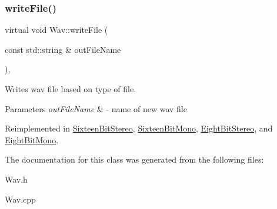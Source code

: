 \subsubsection{\texorpdfstring{write\+File()}{writeFile()}}
{\footnotesize\ttfamily virtual void Wav\+::write\+File (\begin{DoxyParamCaption}\item[{const std\+::string \&}]{out\+File\+Name }\end{DoxyParamCaption})\hspace{0.3cm}{\ttfamily [inline]}, {\ttfamily [virtual]}}

Writes wav file based on type of file.


\begin{DoxyParams}{Parameters}
{\em out\+File\+Name} & -\/ name of new wav file \\
\hline
\end{DoxyParams}


Reimplemented in \hyperlink{classSixteenBitStereo_afe9914b160b78f406186aa6de864c288}{Sixteen\+Bit\+Stereo}, \hyperlink{classSixteenBitMono_a331ba2f00ff9614c1c0dc99ad6fb55f6}{Sixteen\+Bit\+Mono}, \hyperlink{classEightBitStereo_a5eb9c2b69034672b42662c0b50e54d64}{Eight\+Bit\+Stereo}, and \hyperlink{classEightBitMono_ae654eb1cc4fbb5586b33a73081cfb033}{Eight\+Bit\+Mono}.



The documentation for this class was generated from the following files\+:\begin{DoxyCompactItemize}
\item 
Wav.\+h\item 
Wav.\+cpp\end{DoxyCompactItemize}
